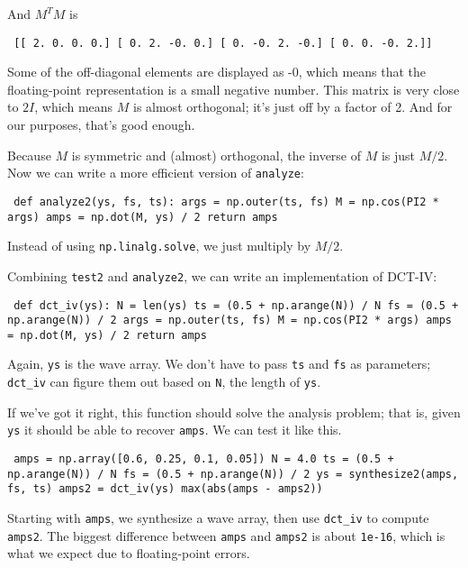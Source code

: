 \documentclass[12pt]{book} \usepackage[width=5.5in,height=8.5in, hmarginratio=3:2,vmarginratio=1:1]{geometry}
\begin{document}
And $M^TM$ is 

\begin{verbatim} [[ 2. 0. 0. 0.] [ 0. 2. -0. 0.] [ 0. -0. 2. -0.] [ 0. 0. -0. 2.]] \end{verbatim} 

Some of the off-diagonal elements are displayed as -0, which means that the floating-point representation is a small negative number. This matrix is very close to $2I$, which means $M$ is almost orthogonal; it's just off by a factor of 2. And for our purposes, that's good enough. 

Because $M$ is symmetric and (almost) orthogonal, the inverse of $M$ is just $M/2$. Now we can write a more efficient version of {\tt analyze}: 

\begin{verbatim} def analyze2(ys, fs, ts): args = np.outer(ts, fs) M = np.cos(PI2 * args) amps = np.dot(M, ys) / 2 return amps \end{verbatim} 

Instead of using {\tt np.linalg.solve}, we just multiply by $M/2$. 

Combining {\tt test2} and {\tt analyze2}, we can write an implementation of DCT-IV: 

\begin{verbatim} def dct_iv(ys): N = len(ys) ts = (0.5 + np.arange(N)) / N fs = (0.5 + np.arange(N)) / 2 args = np.outer(ts, fs) M = np.cos(PI2 * args) amps = np.dot(M, ys) / 2 return amps \end{verbatim} 

Again, {\tt ys} is the wave array. We don't have to pass {\tt ts} and {\tt fs} as parameters; \verb"dct_iv" can figure them out based on {\tt N}, the length of {\tt ys}. 

If we've got it right, this function should solve the analysis problem; that is, given {\tt ys} it should be able to recover {\tt amps}. We can test it like this. 

\begin{verbatim} amps = np.array([0.6, 0.25, 0.1, 0.05]) N = 4.0 ts = (0.5 + np.arange(N)) / N fs = (0.5 + np.arange(N)) / 2 ys = synthesize2(amps, fs, ts) amps2 = dct_iv(ys) max(abs(amps - amps2)) \end{verbatim} 

Starting with {\tt amps}, we synthesize a wave array, then use \verb"dct_iv" to compute {\tt amps2}. The biggest difference between {\tt amps} and {\tt amps2} is about {\tt 1e-16}, which is what we expect due to floating-point errors. 
\end{document}
